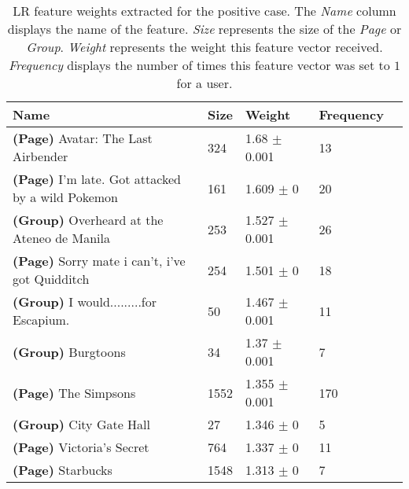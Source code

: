 \begin{table}[h]
\begin{minipage}[b]{1.0\textwidth}
\centering
  \begin{tabular}{|l|l|l|l|l|} %
  \hline
  \textbf{Name} & \textbf{Size} & \textbf{Weight} & \textbf{Frequency} \\ \hline

\small{\textbf{(Page)} Avatar: The Last Airbender} & 324 & 1.68 $\pm$ 0.001 & 13 \\ \hline
\small{\textbf{(Page)} I'm late. Got attacked by a wild Pokemon} & 161 & 1.609 $\pm$ 0 & 20 \\ \hline
\small{\textbf{(Group)} Overheard at the Ateneo de Manila} & 253 & 1.527 $\pm$ 0.001 & 26 \\ \hline
\small{\textbf{(Page)} Sorry mate i can't, i've got Quidditch} & 254 & 1.501 $\pm$ 0 & 18 \\ \hline
\small{\textbf{(Group)} I would.........for Escapium.} & 50 & 1.467 $\pm$ 0.001 & 11 \\ \hline
\small{\textbf{(Group)} Burgtoons} & 34 & 1.37 $\pm$ 0.001 & 7 \\ \hline
\small{\textbf{(Page)} The Simpsons} & 1552 & 1.355 $\pm$ 0.001 & 170 \\ \hline
\small{\textbf{(Group)} City Gate Hall} & 27 & 1.346 $\pm$ 0 & 5 \\ \hline
\small{\textbf{(Page)} Victoria's Secret} & 764 & 1.337 $\pm$ 0 & 11 \\ \hline
\small{\textbf{(Page)} Starbucks} & 1548 & 1.313 $\pm$ 0 & 7 \\ \hline
  \end{tabular}
  \caption{LR feature weights extracted for the positive case. The \emph{Name} column displays the name of the feature.
                        \emph{Size} represents the size of the \emph{Page} or \emph{Group}.
                        \emph{Weight} represents the weight this feature vector received.  
                        \emph{Frequency} displays the number of times this feature vector was set to $1$ for a user.}
\end{minipage}
\end{table}
